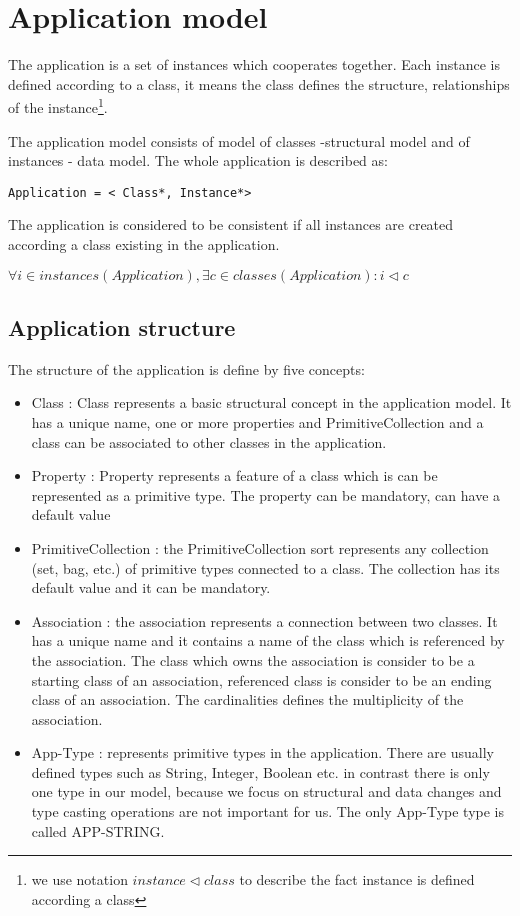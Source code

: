 \documentclass[11pt]{article}
\begin{document}
\section{Application model}
The application is a set of instances which cooperates together. Each instance is defined according to a class, it means the class defines the structure, relationships of the instance\footnote{we use notation $instance \lhd class$ to describe the fact instance is defined according a class}.

The application model consists of model of classes -structural model and of instances - data model. The whole application is described as:

\begin{verbatim}
Application = < Class*, Instance*>
\end{verbatim}
The application is considered to be consistent if all instances are created according a class existing in the application. 

$\forall i \in instances(Application), \exists c \in classes(Application): i \lhd c $


\subsection{Application structure}
The structure of the application is define by five concepts:
\begin{itemize}
	\item Class : Class represents a basic structural concept in the application model. It has a unique name, one or more properties and PrimitiveCollection and a class can be associated to other classes in the application.  
	\item Property : Property represents a feature of  a class which is can be represented as a primitive type. The property can be mandatory, can have a default value
	\item PrimitiveCollection : the PrimitiveCollection sort represents any collection (set, bag, etc.) of primitive types connected to a class. The collection has its default value and it can be mandatory.
	\item Association : the association represents a connection between two classes. It has a unique name and it contains a name of the class which is referenced by the association. The class which owns the association is consider to be a starting class of an association, referenced class is consider to be an ending class of an association. The cardinalities defines the multiplicity of the association.
	\item App-Type : represents primitive types in the application. There are usually defined types such as String, Integer, Boolean etc. in contrast there is only one type in our model, because we focus on structural and data changes and type casting operations are not important for us. The only App-Type type is called APP-STRING.
\end{itemize}
\end{document}
